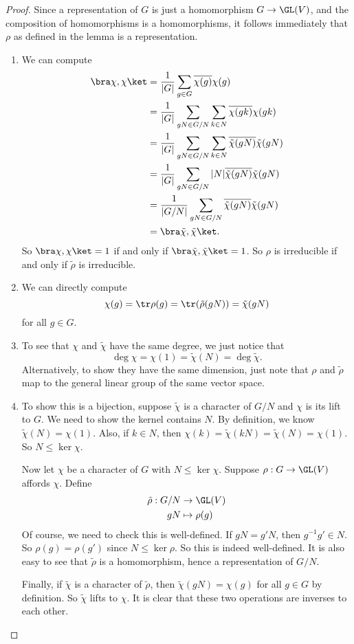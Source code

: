 \documentclass[a4paper]{article}
\begin{document}
\begin{proof}
  Since a representation of $G$ is just a homomorphism $G \to \GL(V)$, and the composition of homomorphisms is a homomorphisms, it follows immediately that $\rho$ as defined in the lemma is a representation.
  \begin{enumerate}
    \item We can compute
      \begin{align*}
        \bra \chi, \chi\ket &= \frac{1}{|G|} \sum_{g \in G} \overline{\chi(g)}\chi(g)\\
        &= \frac{1}{|G|} \sum_{gN \in G/N} \sum_{k \in N} \overline{\chi(gk)}\chi(gk)\\
        &= \frac{1}{|G|} \sum_{gN \in G/N} \sum_{k \in N} \overline{\tilde{\chi}(gN)}\tilde{\chi}(gN)\\
        &= \frac{1}{|G|} \sum_{gN \in G/N} |N| \overline{\tilde{\chi}(gN)}\tilde{\chi}(gN)\\
        &= \frac{1}{|G/N|} \sum_{gN \in G/N} \overline{\tilde{\chi}(gN)}\tilde{\chi}(gN)\\
        &= \bra \tilde{\chi}, \tilde{\chi}\ket.
      \end{align*}
      So $\bra \chi, \chi\ket = 1$ if and only if $\bra \tilde{\chi}, \tilde{\chi}\ket = 1$. So $\rho$ is irreducible if and only if $\tilde{\rho}$ is irreducible.
    \item
      We can directly compute
      \[
        \chi(g) = \tr \rho(g) = \tr (\tilde{\rho}(gN)) = \tilde{\chi}(gN)
      \]
      for all $g \in G$.
    \item To see that $\chi$ and $\tilde{\chi}$ have the same degree, we just notice that
      \[
        \deg \chi = \chi(1) = \tilde{\chi}(N) = \deg \tilde{\chi}.
      \]
      Alternatively, to show they have the same dimension, just note that $\rho$ and $\tilde{\rho}$ map to the general linear group of the same vector space.
    \item To show this is a bijection, suppose $\tilde{\chi}$ is a character of $G/N$ and $\chi$ is its lift to $G$. We need to show the kernel contains $N$. By definition, we know $\tilde{\chi}(N) = \chi(1)$. Also, if $k \in N$, then $\chi(k) = \tilde{\chi}(kN) = \tilde{\chi}(N) = \chi(1)$. So $N \leq \ker \chi$.

  Now let $\chi$ be a character of $G$ with $N \leq \ker \chi$. Suppose $\rho: G \to \GL(V)$ affords $\chi$. Define
  \begin{align*}
    \tilde{\rho}: G/N &\to \GL(V)\\
    gN &\mapsto \rho(g)
  \end{align*}
  Of course, we need to check this is well-defined. If $gN = g'N$, then $g^{-1} g' \in N$. So $\rho(g) = \rho(g')$ since $N \leq \ker \rho$. So this is indeed well-defined. It is also easy to see that $\tilde{\rho}$ is a homomorphism, hence a representation of $G/N$.

  Finally, if $\tilde{\chi}$ is a character of $\tilde{\rho}$, then $\tilde{\chi}(gN) = \chi(g)$ for all $g \in G$ by definition. So $\tilde{\chi}$ lifts to $\chi$. It is clear that these two operations are inverses to each other.

  \end{enumerate}
\end{proof}
\end{document}
